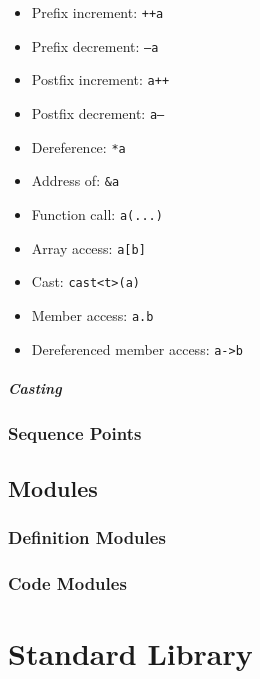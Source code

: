 \documentclass[letterpaper,12pt]{book}
\begin{document}
\begin{itemize}
\begin{itemize}
		\item \texttt{\&}
		\item \texttt{|}
		\item \texttt{\^{}}
		\item \texttt{\&\&}
		\item \texttt{||}
	\end{itemize}
	\item Prefix increment: \texttt{++a}
	\item Prefix decrement: \texttt{--a}
	\item Postfix increment: \texttt{a++}
	\item Postfix decrement: \texttt{a--}
	\item Dereference: \texttt{*a}
	\item Address of: \texttt{\&a}
	\item Function call: \texttt{a(...)}
	\item Array access: \texttt{a[b]}
	\item Cast: \texttt{cast<t>(a)}
	\item Member access: \texttt{a.b}
	\item Dereferenced member access: \texttt{a->b}
\end{itemize}

\subsubsection{Casting}

\section{Sequence Points}

\chapter{Modules}

\section{Definition Modules}

\section{Code Modules}

\part{Standard Library}
\end{document}
